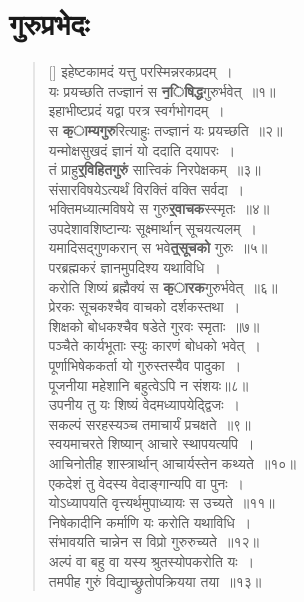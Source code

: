 \documentclass[twoside,12pt,notitlepage]{book}
\begin{document}
\section{गुरुप्रभेदः}
\begin{verse}[\versewidth]
इहेष्टकामदं यत्तु परस्मिन्नरकप्रदम्~।\\[-6pt]
यः प्रयच्छति तज्ज्ञानं स \textbf{\b निषिद्ध}गुरुर्भवेत्~॥१॥\\
इहाभीष्टप्रदं यद्वा परत्र स्वर्गभोगदम्~।\\[-6pt]
स \textbf{\b काम्यगुरु}रित्याहुः तज्ज्ञानं यः प्रयच्छति~॥२॥\\
यन्मोक्षसुखदं ज्ञानं यो ददाति दयापरः~।\\[-6pt]
तं प्राहु\textbf{\b र्विहितगुरुं} सात्त्विकं निरपेक्षकम्~॥३॥\\
संसारविषयेऽत्यर्थं विरक्तिं वक्ति सर्वदा~।\\[-6pt]
भक्तिमध्यात्मविषये स गुरु\textbf{\b र्वाचक}स्स्मृतः~॥४॥\\
उपदेशावशिष्टान्यः सूक्ष्मार्थान् सूचयत्यलम्~।\\[-6pt]
यमादिसद्गुणकरान् स भवे\textbf{\b त्सूचको } गुरुः~॥५॥\footA \\
परब्रह्मकरं ज्ञानमुपदिश्य यथाविधि~।\\[-6pt]
करोति शिष्यं ब्रह्मैक्यं स \textbf{\b कारक}गुरुर्भवेत्~॥६॥\\
प्रेरकः सूचकश्चैव वाचको दर्शकस्तथा~।\\[-6pt]
शिक्षको बोधकश्चैव षडेते गुरवः स्मृताः~॥७॥\\
पञ्चैते कार्यभूताः स्युः कारणं बोधको भवेत्~।\\[-6pt]
पूर्णाभिषेककर्ता यो गुरुस्तस्यैव पादुका~।\\[-6pt]
पूजनीया महेशानि बहुत्वेऽपि न संशयः॥८॥\footA \\
उपनीय तु यः शिष्यं वेदमध्यापयेद्द्विजः~।\\[-6pt]
सकल्पं सरहस्यञ्च तमाचार्यं प्रचक्षते~॥९॥\\
स्वयमाचरते शिष्यान् आचारे स्थापयत्यपि~।\\[-6pt]
आचिनोतीह शास्त्रार्थान् आचार्यस्तेन कथ्यते~॥१०॥ \\
एकदेशं तु वेदस्य वेदाङ्गान्यपि वा पुनः~।\\[-6pt]
योऽध्यापयति वृत्त्यर्थमुपाध्यायः स उच्यते~॥११॥\\
निषेकादीनि कर्माणि यः करोति यथाविधि~।\\[-6pt]
संभावयति चान्नेन स विप्रो गुरुरुच्यते~॥१२॥\\
अल्पं वा बहु वा यस्य श्रुतस्योपकरोति यः~।\\[-6pt]
तमपीह गुरुं विद्याच्छ्रुतोपक्रियया तया~॥१३॥
\end{verse}
\end{document}
